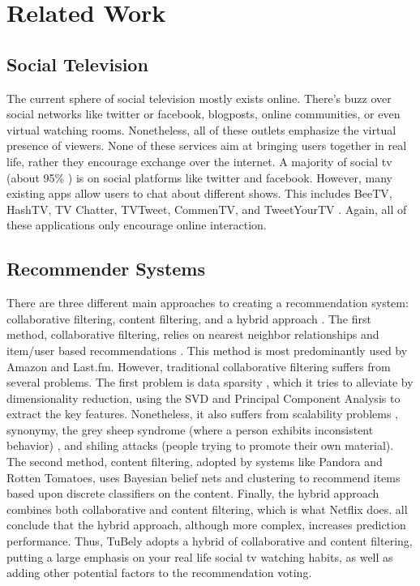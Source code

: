 \section{Related Work}

\subsection{Social Television}
The current sphere of social television mostly exists online.  There’s
buzz over social networks like twitter or facebook, blogposts, online
communities, or even virtual watching rooms.  Nonetheless, all of
these outlets emphasize the virtual presence of viewers.  None of
these services aim at bringing users together in real life, rather
they encourage exchange over the internet.  A majority of social tv
(about 95\% \cite{chausse}) is on social platforms like twitter and
facebook.  However, many existing apps allow users to chat about
different shows.  This includes BeeTV, HashTV, TV Chatter, TVTweet,
CommenTV, and TweetYourTV \cite{chausse}.  Again, all of these
applications only encourage online interaction.

\subsection{Recommender Systems} 
\label{sec:recommender}
There are three different main approaches to creating a recommendation
system: collaborative filtering, content filtering, and a hybrid
approach \cite{Su} \cite{vozalis}.  The first method, collaborative
filtering, relies on nearest neighbor relationships and item/user
based recommendations \cite{su}.  This method is most predominantly
used by Amazon and Last.fm.  However, traditional collaborative
filtering suffers from several problems.  The first problem is data
sparsity \cite{su} \cite{melville}, which it tries to alleviate by
dimensionality reduction, using the SVD and Principal Component
Analysis to extract the key features.  Nonetheless, it also suffers
from scalability problems \cite{papagelis}, synonymy, the grey sheep
syndrome (where a person exhibits inconsistent behavior) \cite{su},
and shiling attacks (people trying to promote their own material).
The second method, content filtering, adopted by systems like Pandora
and Rotten Tomatoes, uses Bayesian belief nets and clustering to
recommend items based upon discrete classifiers on the content.
Finally, the hybrid approach combines both collaborative and content
filtering, which is what Netflix does.  \cite{su} \cite{melville} all
conclude that the hybrid approach, although more complex, increases
prediction performance.  Thus, TuBely adopts a hybrid of collaborative
and content filtering, putting a large emphasis on your real life
social tv watching habits, as well as adding other potential factors
to the recommendation voting.

